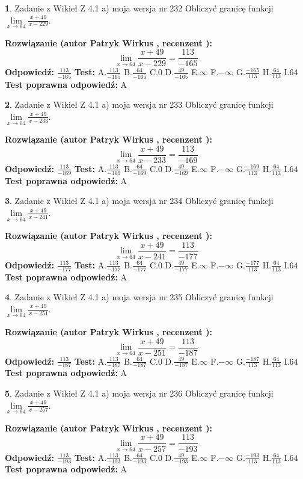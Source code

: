 \documentclass[12pt, a4paper]{article}
\theoremstyle{definition} %
\newtheorem{zad}{}
\newcommand{\zadStart}[1]{\begin{zad}#1\newline}
\newcommand{\zadStop}{\end{zad}}
\newcommand{\rozwStart}[2]{\noindent \textbf{Rozwiązanie (autor #1 , recenzent #2): }\newline}
\newcommand{\rozwStop}{\newline}
\newcommand{\odpStart}{\noindent \textbf{Odpowiedź:}\newline}
\newcommand{\odpStop}{\newline}
\newcommand{\testStart}{\noindent \textbf{Test:}\newline}
\newcommand{\testStop}{\newline}
\newcommand{\kluczStart}{\noindent \textbf{Test poprawna odpowiedź:}\newline}
\newcommand{\kluczStop}{\newline}
\begin{document}
\zadStart{Zadanie z Wikieł Z 4.1 a) moja wersja nr 232}
Obliczyć granicę funkcji $\lim\limits_{x\to64}\frac{x+49}{x-229}$.
\zadStop
\rozwStart{Patryk Wirkus}{}
$$\lim\limits_{x\to64}\frac{x+49}{x-229} = \frac{113}{-165}$$
\rozwStop
\odpStart
$\frac{113}{-165}$
\odpStop
\testStart
A.$\frac{113}{-165}$
B.$\frac{64}{-165}$
C.$0$
D.$\frac{49}{-165}$
E.$\infty$
F.$-\infty$
G.$\frac{-165}{113}$
H.$\frac{64}{113}$
I.$64$
\testStop
\kluczStart
A
\kluczStop



\zadStart{Zadanie z Wikieł Z 4.1 a) moja wersja nr 233}
Obliczyć granicę funkcji $\lim\limits_{x\to64}\frac{x+49}{x-233}$.
\zadStop
\rozwStart{Patryk Wirkus}{}
$$\lim\limits_{x\to64}\frac{x+49}{x-233} = \frac{113}{-169}$$
\rozwStop
\odpStart
$\frac{113}{-169}$
\odpStop
\testStart
A.$\frac{113}{-169}$
B.$\frac{64}{-169}$
C.$0$
D.$\frac{49}{-169}$
E.$\infty$
F.$-\infty$
G.$\frac{-169}{113}$
H.$\frac{64}{113}$
I.$64$
\testStop
\kluczStart
A
\kluczStop



\zadStart{Zadanie z Wikieł Z 4.1 a) moja wersja nr 234}
Obliczyć granicę funkcji $\lim\limits_{x\to64}\frac{x+49}{x-241}$.
\zadStop
\rozwStart{Patryk Wirkus}{}
$$\lim\limits_{x\to64}\frac{x+49}{x-241} = \frac{113}{-177}$$
\rozwStop
\odpStart
$\frac{113}{-177}$
\odpStop
\testStart
A.$\frac{113}{-177}$
B.$\frac{64}{-177}$
C.$0$
D.$\frac{49}{-177}$
E.$\infty$
F.$-\infty$
G.$\frac{-177}{113}$
H.$\frac{64}{113}$
I.$64$
\testStop
\kluczStart
A
\kluczStop



\zadStart{Zadanie z Wikieł Z 4.1 a) moja wersja nr 235}
Obliczyć granicę funkcji $\lim\limits_{x\to64}\frac{x+49}{x-251}$.
\zadStop
\rozwStart{Patryk Wirkus}{}
$$\lim\limits_{x\to64}\frac{x+49}{x-251} = \frac{113}{-187}$$
\rozwStop
\odpStart
$\frac{113}{-187}$
\odpStop
\testStart
A.$\frac{113}{-187}$
B.$\frac{64}{-187}$
C.$0$
D.$\frac{49}{-187}$
E.$\infty$
F.$-\infty$
G.$\frac{-187}{113}$
H.$\frac{64}{113}$
I.$64$
\testStop
\kluczStart
A
\kluczStop



\zadStart{Zadanie z Wikieł Z 4.1 a) moja wersja nr 236}
Obliczyć granicę funkcji $\lim\limits_{x\to64}\frac{x+49}{x-257}$.
\zadStop
\rozwStart{Patryk Wirkus}{}
$$\lim\limits_{x\to64}\frac{x+49}{x-257} = \frac{113}{-193}$$
\rozwStop
\odpStart
$\frac{113}{-193}$
\odpStop
\testStart
A.$\frac{113}{-193}$
B.$\frac{64}{-193}$
C.$0$
D.$\frac{49}{-193}$
E.$\infty$
F.$-\infty$
G.$\frac{-193}{113}$
H.$\frac{64}{113}$
I.$64$
\testStop
\kluczStart
A
\kluczStop
\end{document}
